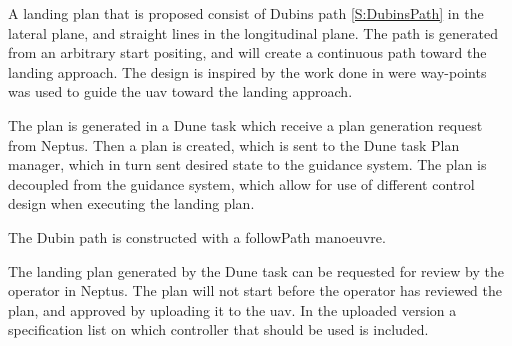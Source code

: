 A landing plan that is proposed consist of Dubins path \ref{S:DubinsPath} in the lateral plane, and straight lines in the longitudinal plane. The path is generated from an arbitrary start positing, and will create a continuous path toward the landing approach. The design is inspired by the work done in \citep{Skulstad&Syversen} were way-points was used to guide the uav toward the landing approach.

The plan is generated in a Dune task which receive a plan generation request from Neptus. Then a plan is created, which is sent to the Dune task Plan manager, which in turn sent desired state to the guidance system. The plan is decoupled from the guidance system, which allow for use of different control design when executing the landing plan.

The Dubin path is constructed with a followPath manoeuvre.

The landing plan generated by the Dune task can be requested for review by the operator in Neptus. The plan will not start before the operator has reviewed the plan, and approved by uploading it to the uav. In the uploaded version a specification list on which controller that should be used is included.  
